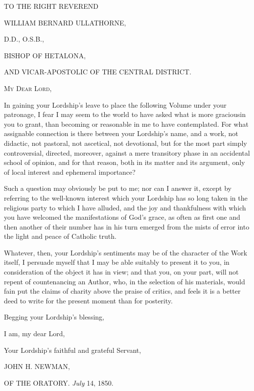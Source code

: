 



TO THE RIGHT REVEREND

WILLIAM BERNARD ULLATHORNE,

D.D., O.S.B.,

BISHOP OF HETALONA,

AND VICAR-APOSTOLIC OF THE CENTRAL DISTRICT.


M\textsc{y} D\textsc{ear} L\textsc{ord},

In gaining your Lordship's leave to place the following Volume
under your patronage, I fear I may seem to the world to have asked
what is more gracious\textbf{}in you to grant, than becoming or
reasonable in me to have contemplated. For what assignable connection
is there between your Lordship's name, and a work, not didactic, not
pastoral, not ascetical, not devotional, but for the most part simply
controversial, directed, moreover, against a mere transitory phase in
an accidental school of opinion, and for that reason, both in its
matter and its argument, only of local interest and ephemeral
importance?


Such a question may obviously be put to me; nor can I answer it,
except by referring to the well-known interest which your Lordship has
so long taken in the religious party to which I have alluded, and the
joy and thankfulness with which you have welcomed the manifestations
of God's grace, as often as first one and then another of their number
has in his turn emerged from the mists of error into the light and
peace of Catholic truth.


Whatever, then, your Lordship's sentiments may be of the character
of the Work itself, I persuade myself that I may be able suitably to
present it to you, in consideration of the object it has in view; and
that you, on your part, will not repent of countenancing an Author,
who, in the selection of his materials, would fain put the claims of
charity above the praise of critics, and feels it is a better deed to
write for the present moment than for posterity.


Begging your Lordship's blessing,

I am, my dear Lord,

Your Lordship's faithful and grateful Servant,


JOHN H. NEWMAN,

OF THE ORATORY.
\emph{July} 14, 1850.








